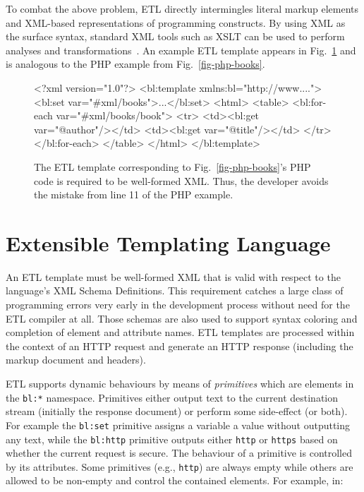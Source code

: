 \documentclass{www2003-submission}
\newcommand{\smtexttt}[1]{{\small\texttt{#1}}}
\newcommand{\ns}[1]{{\small\texttt{#1:*}}}
\newcommand{\figref}[1]{Fig.~\ref{fig-#1}}
\newcommand{\etl}{ETL}
\newenvironment{smalllisting}%
{\renewcommand{\baselinestretch}{1}\small\listing}%
{\renewcommand{\baselinestretch}{2}\endlisting}
\begin{document}
To combat the above problem, ETL directly intermingles literal markup
elements and XML-based representations of programming
constructs.  By using XML as the surface
syntax, standard XML tools such as XSLT  can be used to perform
analyses and transformations~\cite{Badros-www9}.  An example \etl{}
template appears in \figref{etl-books} and is analogous to the PHP
example from
\figref{php-books}.

\begin{figure}[tb]
\begin{smalllisting}{1}
<?xml version="1.0"?>
<bl:template xmlns:bl="http://www....">
 <bl:set var="#xml/books">...</bl:set>
 <html>
  <table>
   <bl:for-each var="#xml/books/book">
    <tr> 
     <td><bl:get var="@author"/></td>
     <td><bl:get var="@title"/></td>
    </tr>
   </bl:for-each>
  </table>
 </html>
</bl:template>
\end{smalllisting}
\caption{The \etl{} template corresponding to \figref{php-books}'s PHP
code is required to be well-formed XML\@.  Thus, the developer
avoids the mistake from line 11 of the PHP example.
\label{fig-etl-books}}
\end{figure}

\section{\hspace*{-.1in}Extensible Templating Language}
\label{sec-etl}

An \etl{} template must be well-formed XML that is valid with respect
to the language's XML Schema Definitions.  This requirement catches a
large class of programming errors very early in the development
process without need for the \etl{} compiler at all.  Those schemas
are also used to support syntax coloring and completion of element and
attribute names.  \etl{} templates are processed within the context of
an HTTP request and generate an HTTP
response (including the markup document and headers).

\etl{} supports dynamic behaviours by means of \emph{primitives} which
are elements in the \ns{bl} namespace.  Primitives either output text
to the current destination stream (initially the response document) or
perform some side-effect (or both).  For example the \smtexttt{bl:set}
primitive assigns a variable a value without outputting any text,
while the \smtexttt{bl:http} primitive outputs either \smtexttt{http}
or \smtexttt{https} based on whether the current request is secure.
The behaviour of a primitive is controlled by its attributes.  Some
primitives (e.g., \smtexttt{http}) are always empty while others are
allowed to be non-empty and control the contained elements.
For example, in:
\end{document}
